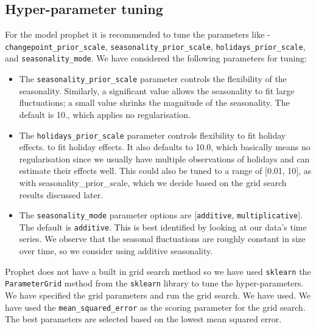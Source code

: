 \documentclass[mstat,12pt]{unswthesis}
\begin{document}
\hypertarget{hyper-parameter-tuning}{%
\subsection{Hyper-parameter tuning}\label{hyper-parameter-tuning}}

For the model prophet it is recommended to tune the parameters like -
\linebreak \texttt{changepoint\_prior\_scale},
\texttt{seasonality\_prior\_scale}, \texttt{holidays\_prior\_scale}, and
\texttt{seasonality\_mode}. We have considered the following parameters
for tuning:

\begin{itemize}
\item
  The \texttt{seasonality\_prior\_scale} parameter controls the
  flexibility of the seasonality. Similarly, a significant value allows
  the seasonality to fit large fluctuations; a small value shrinks the
  magnitude of the seasonality. The default is 10., which applies no
  regularisation.
\item
  The \texttt{holidays\_prior\_scale} parameter controls flexibility to
  fit holiday effects. to fit holiday effects. It also defaults to 10.0,
  which basically means no regularisation since we usually have multiple
  observations of holidays and can estimate their effects well. This
  could also be tuned to a range of {[}0.01, 10{]}, as with
  seasonality\_prior\_scale, which we decide based on the grid search
  results discussed later.
\item
  The \texttt{seasonality\_mode} parameter options are
  {[}\texttt{\textquotesingle{}additive\textquotesingle{}},
  \texttt{\textquotesingle{}multiplicative\textquotesingle{}}{]}. The
  default is \texttt{\textquotesingle{}additive\textquotesingle{}}. This
  is best identified by looking at our data's time series. We observe
  that the seasonal fluctuations are roughly constant in size over time,
  so we consider using additive seasonality.
\end{itemize}

Prophet does not have a built in grid search method so we have used
\texttt{sklearn} the \texttt{ParameterGrid} method from the
\texttt{sklearn} library to tune the hyper-parameters. We have specified
the grid parameters and run the grid search. We have used. We have used
the \texttt{mean\_squared\_error} as the scoring parameter for the grid
search. The best parameters are selected based on the lowest mean
squared error.
\end{document}
